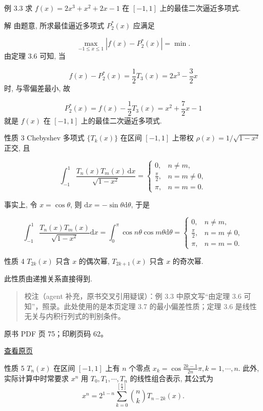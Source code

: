 例 3.3 求 \(f(x) = 2x^3 + x^2 + 2x - 1\) 在 \([-1,1]\) 上的最佳二次逼近多项式.

解 由题意, 所求最佳逼近多项式 \(P_{2}^*(x)\) 应满足

\[
\max_{-1 \leqslant x \leqslant 1} |f(x) - P_{2}^*(x)| = \min .
\] 由定理 3.6 可知, 当

\[
f(x) - P_{2}^*(x) = \frac{1}{2} T_3(x) = 2x^3 - \frac{3}{2}x
\] 时, 与零偏差最小, 故

\[
P_{2}^*(x) = f(x) - \frac{1}{2} T_3(x) = x^2 + \frac{7}{2}x - 1
\] 就是 \(f(x)\) 在 \([-1,1]\) 上的最佳二次逼近多项式.

性质 3 Chebyshev 多项式 \(\{T_k(x)\}\) 在区间 \([-1,1]\) 上带权 \(\rho(x) = 1 / \sqrt{1-x^2}\) 正交, 且

\[
\int_{-1}^{1} \frac{T_n(x)T_m(x)\,\mathrm{d}x}{\sqrt{1-x^2}} = \begin{cases} 0, & n \neq m, \\ \frac{\pi}{2}, & n = m \neq 0, \\ \pi, & n = m = 0. \end{cases} \tag{3.4.8}
\]

事实上, 令 \(x = \cos \theta\), 则 \(\mathrm{d}x = -\sin \theta \mathrm{d}\theta\), 于是

\[
\int_{-1}^{1} \frac{T_n(x)T_m(x)}{\sqrt{1-x^2}} \mathrm{d}x = \int_{0}^{\pi} \cos n\theta \cos m\theta \mathrm{d}\theta = \begin{cases} 0, & n \neq m, \\ \frac{\pi}{2}, & n = m \neq 0, \\ \pi, & n = m = 0. \end{cases}
\]

性质 4 \(T_{2k}(x)\) 只含 \(x\) 的偶次幂, \(T_{2k+1}(x)\) 只含 \(x\) 的奇次幂.

此性质由递推关系直接得到.

\begin{quote}
校注（agent 补充，原书交叉引用疑误）：例 3.3 中原文写``由定理 3.6 可知''，照录。此处使用的是本页定理 3.7 的最小偏差性质；定理 3.6 是线性无关与内积行列式的判别条件。
\end{quote}

\clearpage

原书 PDF 页 75；印刷页码 62。

\href{source-images/pdf-075.jpeg}{查看原页}

性质 5 \(T_n(x)\) 在区间 \([-1,1]\) 上有 \(n\) 个零点 \(x_k = \cos \frac{2k-1}{2n}\pi, k=1, \cdots, n\). 此外, 实际计算中时常要求 \(x^n\) 用 \(T_0, T_1, \cdots, T_n\) 的线性组合表示, 其公式为 \[
x^n = 2^{1-n} \sum_{k=0}^{[\frac{n}{2}]} \binom{n}{k} T_{n-2k}(x). \tag{3.4.9}
\]

